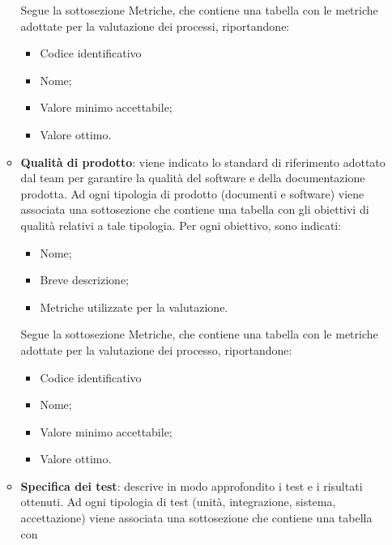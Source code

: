 \begin{itemize}
\begin{itemize}
                        Segue la sottosezione Metriche, che contiene una tabella con le metriche
                        adottate per la valutazione dei processi, riportandone:
                        \begin{itemize}
                              \item Codice identificativo
                              \item Nome;
                              \item Valore minimo accettabile;
                              \item Valore ottimo.
                        \end{itemize}
                  \item \textbf{Qualità di prodotto}: viene indicato lo standard di riferimento adottato dal team per garantire la qualità del software e della documentazione prodotta.
                        Ad ogni tipologia di prodotto (documenti e software) viene associata una sottosezione che contiene una tabella con
                        gli obiettivi di qualità relativi a tale tipologia. Per ogni obiettivo, sono indicati:
                        \begin{itemize}
                              \item Nome;
                              \item Breve descrizione;
                              \item Metriche utilizzate per la valutazione.
                        \end{itemize}
                        Segue la sottosezione Metriche, che contiene una tabella con le metriche
                        adottate per la valutazione dei processo, riportandone:
                        \begin{itemize}
                              \item Codice identificativo
                              \item Nome;
                              \item Valore minimo accettabile;
                              \item Valore ottimo.
                        \end{itemize}
                  \item \textbf{Specifica dei test}: descrive in modo approfondito i test e i risultati ottenuti.
                        Ad ogni tipologia di test (unità, integrazione, sistema, accettazione) viene associata una sottosezione che contiene una tabella con

\end{itemize}
\end{itemize}
